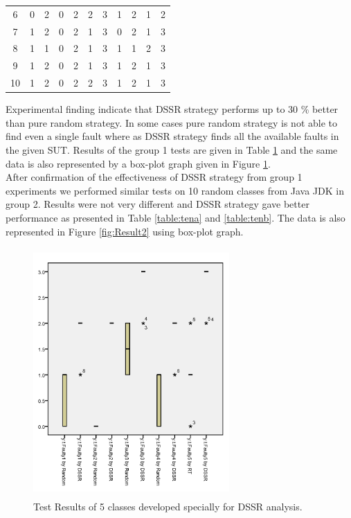 \documentclass[10pt, conference, compsocconf]{IEEEtran}
\begin{document}
\begin{table}[ht]
\begin{tabular}{| c | c | c | c | c | c | c | c | c | c | c |}
6 & 0 & 2 & 0 & 2 & 2 & 3 & 1 & 2 & 1 & 2 \\

7 & 1 & 2 & 0 & 2 & 1 & 3 & 0 & 2 & 1 & 3 \\

8 & 1 & 1 & 0 & 2 & 1 & 3 & 1 & 1 & 2 & 3 \\

9 & 1 & 2 & 0 & 2 & 1 & 3 & 1 & 2 & 1 & 3 \\

10 & 1 & 2 & 0 & 2 & 2 & 3 & 1 & 2 & 1 & 3 \\  [1ex] %

\hline %
\end{tabular}
\label{table:five} %
\end{table}


Experimental finding indicate that DSSR strategy performs up to 30 \% better than pure random strategy. In some cases pure random strategy is not able to find even a single fault where as DSSR strategy finds all the available faults in the given SUT. Results of the group 1 tests are given in Table \ref{table:five} and the same data is also represented by a box-plot graph given in Figure \ref{fig:Result1}.\\


After confirmation of the effectiveness of DSSR strategy from group 1 experiments we performed similar tests on 10 random classes from Java JDK in group 2. Results were not very different and DSSR strategy gave better performance as presented in Table \ref{table:tena} and \ref{table:tenb}.  The data is also represented in Figure \ref{fig:Result2} using box-plot graph.\\



\begin{figure}[htp]
\centering
\includegraphics[width=7.5cm,height=9.5cm]{owntests.png}
\caption{Test Results of 5 classes developed specially for DSSR analysis.}
\label{fig:Result1}
\end{figure}
\end{document}
